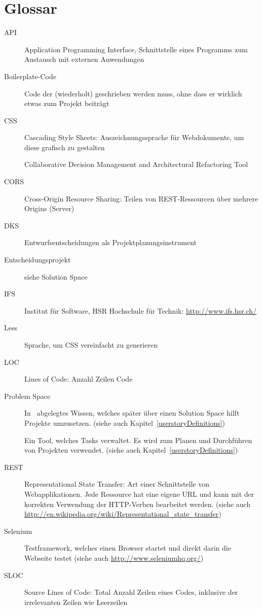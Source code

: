 \chapter{Glossar}
	\begin{description}
		\item[API]{Application Programming Interface, Schnittstelle eines Programms zum Austausch mit externen Anwendungen}
		\item[Boilerplate-Code]{Code der (wiederholt) geschrieben werden muss, ohne dass er wirklich etwas zum Projekt beiträgt}
		\item[CSS]{Cascading Style Sheets: Auszeichnungssprache für Webdokumente, um diese grafisch zu gestalten}
		\item[\cdar]{Collaborative Decision Management and Architectural Refactoring Tool \cite{tinner_collaborative_2014}}
		\item[CORS]{Cross-Origin Resource Sharing: Teilen von REST-Ressourcen über mehrere Origins (Server)}
		\item[DKS]{\dks}
		\item[\eeppi]{Entwurfsentscheidungen als Projektplanungsinstrument}
		\item[Entscheidungsprojekt]{siehe Solution Space}
		\item[IFS]{Institut für Software, HSR Hochschule für Technik: \url{http://www.ifs.hsr.ch/}}
		\item[Less]{Sprache, um CSS vereinfacht zu generieren}
		\item[LOC]{Lines of Code: Anzahl Zeilen Code}
		\item[Problem Space]{In \cdar\ abgelegtes Wissen, welches später über einen Solution Space hilft Projekte umzusetzen. (siehe auch Kapitel~\ref{userstoryDefinitions})}
		\item[\ppt]{Ein Tool, welches Tasks verwaltet. Es wird zum Planen und Durchführen von Projekten verwendet. (siehe auch Kapitel~\ref{userstoryDefinitions})}
		\item[REST]{Representational State Transfer: Art einer Schnittstelle von Webapplikationen. Jede Ressource hat eine eigene URL und kann mit der korrekten Verwendung der HTTP-Verben bearbeitet werden. (siehe auch \url{http://en.wikipedia.org/wiki/Representational_state_transfer})}
		\item[Selenium]{Testframework, welches einen Browser startet und direkt darin die Webseite testet (siehe auch \url{http://www.seleniumhq.org/})}
		\item[SLOC]{Source Lines of Code: Total Anzahl Zeilen eines Codes, inklusive der irrelevanten Zeilen wie Leerzeilen}

\end{description}
